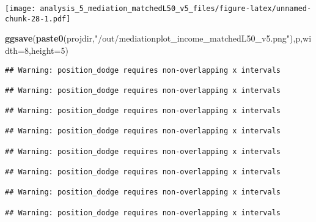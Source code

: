 \documentclass[
]{article}
\newenvironment{Shaded}{\begin{snugshade}}{\end{snugshade}}
\newcommand{\DataTypeTok}[1]{\textcolor[rgb]{0.13,0.29,0.53}{#1}}
\newcommand{\DecValTok}[1]{\textcolor[rgb]{0.00,0.00,0.81}{#1}}
\newcommand{\KeywordTok}[1]{\textcolor[rgb]{0.13,0.29,0.53}{\textbf{#1}}}
\newcommand{\NormalTok}[1]{#1}
\newcommand{\StringTok}[1]{\textcolor[rgb]{0.31,0.60,0.02}{#1}}
\begin{document}
\texttt{[image: analysis\_5\_mediation\_matchedL50\_v5\_files/figure-latex/unnamed-chunk-28-1.pdf]}

\begin{Shaded}
\begin{Highlighting}[]
\KeywordTok{ggsave}\NormalTok{(}\KeywordTok{paste0}\NormalTok{(projdir,}\StringTok{"/out/mediationplot_income_matchedL50_v5.png"}\NormalTok{),p,}\DataTypeTok{width=}\DecValTok{8}\NormalTok{,}\DataTypeTok{height=}\DecValTok{5}\NormalTok{)}
\end{Highlighting}
\end{Shaded}

\begin{verbatim}
## Warning: position_dodge requires non-overlapping x intervals

## Warning: position_dodge requires non-overlapping x intervals

## Warning: position_dodge requires non-overlapping x intervals

## Warning: position_dodge requires non-overlapping x intervals

## Warning: position_dodge requires non-overlapping x intervals

## Warning: position_dodge requires non-overlapping x intervals

## Warning: position_dodge requires non-overlapping x intervals

## Warning: position_dodge requires non-overlapping x intervals
\end{verbatim}
\end{document}
